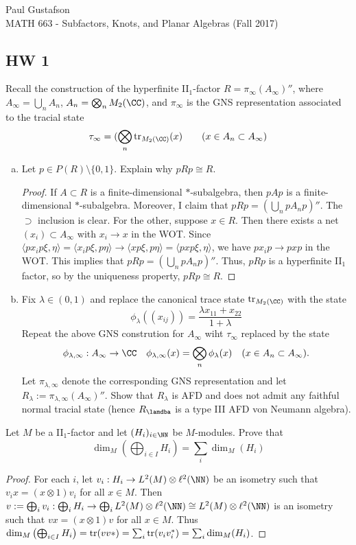 \documentclass{article}
\begin{document}
\noindent Paul Gustafson\\
\noindent MATH 663 - Subfactors, Knots, and Planar Algebras (Fall 2017)

\subsection*{HW 1}
 Recall the construction of the hyperfinite II$_1$-factor $R = \pi_\infty(A_\infty)''$, where $A_\infty = \bigcup_n A_n$, $A_n = \bigotimes_n M_2(\CC)$, and $\pi_\infty$ is the GNS representation associated to the tracial state
$$ \tau_\infty = (\bigotimes_n \Tr_{M_2(\CC)}(x) \qquad (x \in A_n \subset A_\infty) $$
\begin{enumerate}[(a)]
\item Let $p \in P(R)\setminus \{0,1\}$. Explain why $pRp \cong R$.
  \begin{proof}
    If $A \subset R$ is a finite-dimensional $*$-subalgebra, then $pAp$ is a finite-dimensional $*$-subalgebra.
    Moreover, I claim that $pRp = \left( \bigcup_n pA_np \right)''$. The $\supset$ inclusion is clear.  For the
    other, suppose $x \in R$.  Then there exists a net $(x_i) \subset A_\infty$ with $x_i \to x$ in the WOT.
    Since $\langle p x_i p \xi, \eta \rangle = \langle x_i p \xi, p \eta \rangle \to \langle x p \xi, p \eta \rangle = \langle pxp \xi, \eta \rangle$, we have $px_ip \to pxp$ in the WOT.  This implies that $pRp = \left( \bigcup_n pA_np \right)''$.   Thus,
    $pRp$ is a hyperfinite II$_1$ factor, so by the uniqueness property, $pRp \cong R$.    
  \end{proof}

\item Fix $\lambda \in (0,1)$ and replace the canonical trace state $\Tr_{M_2(\CC)}$ with the state
  $$ \phi_\lambda((x_{ij})) = \frac{\lambda x_{11} + x_{22}}{1 + \lambda} $$
  Repeat the above GNS constrution for $A_\infty$ wiht $\tau_\infty$ replaced by
  the state
  $$\phi_{\lambda,\infty}:A_\infty \to \CC \quad \phi_{\lambda,\infty}(x) = \bigotimes_n\phi_\lambda(x) \quad (x \in A_n \subset A_\infty).$$
  Let $\pi_{\lambda,\infty}$ denote the corresponding GNS representation and
  let $R_\lambda := \pi_{\lambda, \infty}(A_\infty)''$.
  Show that $R_\lambda$ is AFD and does not admit any faithful normal tracial state (hence $R_\lamdba$ is a type III AFD von Neumann algebra).
\end{enumerate}

 Let $M$ be a II$_1$-factor and let $(H_i)_{i \in \NN}$ be $M$-modules. Prove that
$$\dim_M \left( \bigoplus_{i\in I} H_i \right) = \sum_i \dim_M(H_i)$$
\begin{proof}
  For each $i$, let $v_i: H_i \to L^2(M) \otimes \ell^2(\NN)$ be an isometry such that $v_i x = (x \otimes 1) v_i$ for all $x \in M$. Then
  $v := \bigoplus_i v_i: \bigoplus_i H_i \to \bigoplus_i L^2(M) \otimes \ell^2(\NN) \cong L^2(M) \otimes \ell^2(\NN)$ is an isometry such that
  $v x = (x \otimes 1) v$ for all $x \in M$.  Thus
  $\dim_M \left( \bigoplus_{i\in I} H_i \right) = \operatorname{tr}(v v*) = \sum_i \operatorname{tr}(v_i v_i^*) = \sum_i \dim_M(H_i)$.
\end{proof}
\end{document}
